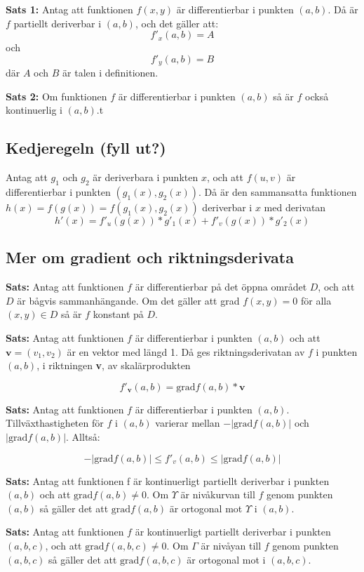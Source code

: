 \documentclass[a4paper,12pt]{article}
\begin{document}
\textbf{Sats 1:} Antag att funktionen $f(x, y)$ är differentierbar i punkten $(a, b)$. Då är $f$ partiellt deriverbar i $(a, b)$, och det gäller att:
\[
    f'_x(a, b) = A 
\]
och
\[
    f'_y(a, b) = B
\]
där $A$ och $B$ är talen i definitionen.

\textbf{Sats 2:} Om funktionen $f$ är differentierbar i punkten $(a, b)$ så är $f$ också kontinuerlig i $(a, b)$.t

\subsection{Kedjeregeln (fyll ut?)}
Antag att $g_1$ och $g_2$ är deriverbara i punkten $x$, och att $f(u, v)$ är differentierbar i punkten $(g_1(x), g_2(x))$.
Då är den sammansatta funktionen $h(x) = f(g(x)) = f(g_1(x), g_2(x))$ deriverbar i $x$ med derivatan
\[
    h'(x) = f'_u(g(x)) * g'_1(x) + f'_v(g(x))*g'_2(x)
\]

\subsection{Mer om gradient och riktningsderivata}
\textbf{Sats:} Antag att funktionen $f$ är differentierbar på det öppna området $D$, och att $D$ är bågvis sammanhängande. 
Om det gäller att grad $f(x, y) = 0$ för alla $(x, y) \in D$ så är $f$ konstant på $D$.

\textbf{Sats:} Antag att funktionen $f$ är differentierbar i punkten $(a, b)$ och att $\textbf{v} = (v_1, v_2)$ är en vektor med längd 1.
Då ges riktningsderivatan av $f$ i punkten $(a, b)$, i riktningen \textbf{v}, av skalärprodukten

\[
    f'_\textbf{v}(a, b) = \text{grad} f(a, b)*\textbf{v}
\]

\textbf{Sats:} Antag att funktionen $f$ är differentierbar i punkten $(a, b)$. Tillväxthastigheten för $f$ i $(a, b)$ varierar mellan $-|\text{grad} f(a, b)|$ och $|\text{grad} f(a, b)|$. Alltså:

\[
    -|\text{grad} f(a, b)| \leq f'_v(a, b) \leq |\text{grad} f(a, b)|
\]

\textbf{Sats:} Antag att funktionen f är kontinuerligt partiellt deriverbar i punkten $(a, b)$ och att $\text{grad} f(a, b) \neq 0$. 
Om $\Upsilon$ är nivåkurvan till $f$ genom punkten $(a, b)$ så gäller det att $\text{grad} f(a, b)$ är ortogonal mot $\Upsilon$ i $(a, b)$.

\textbf{Sats:} Antag att funktionen $f$ är kontinuerligt partiellt deriverbar i punkten $(a, b, c)$, och att $\text{grad} f(a, b, c) \neq 0$. 
Om $\Gamma$ är nivåyan till $f$ genom punkten $(a, b, c)$ så gäller det att $\text{grad} f(a, b, c)$ är ortogonal mot \Gamma i $(a, b, c)$.
\end{document}
